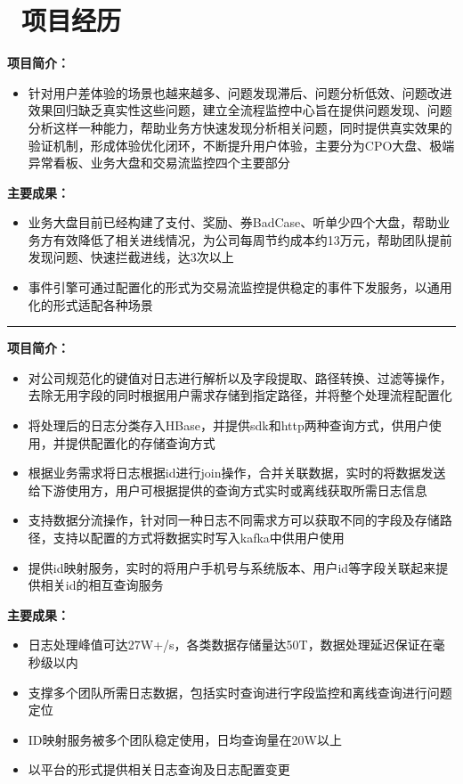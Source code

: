 \documentclass{resume}
\begin{document}
\section{\faUsers\ 项目经历}
\textbf{项目简介：}
\begin{itemize}
  \item 针对用户差体验的场景也越来越多、问题发现滞后、问题分析低效、问题改进效果回归缺乏真实性这些问题，建立全流程监控中心旨在提供问题发现、问题分析这样一种能力，帮助业务方快速发现分析相关问题，同时提供真实效果的验证机制，形成体验优化闭环，不断提升用户体验，主要分为CPO大盘、极端异常看板、业务大盘和交易流监控四个主要部分
\end{itemize}
\textbf{主要成果：}
\begin{itemize}
  \item 业务大盘目前已经构建了支付、奖励、券BadCase、听单少四个大盘，帮助业务方有效降低了相关进线情况，为公司每周节约成本约13万元，帮助团队提前发现问题、快速拦截进线，达3次以上
  \item 事件引擎可通过配置化的形式为交易流监控提供稳定的事件下发服务，以通用化的形式适配各种场景
\end{itemize}

\rule{\textwidth}{0.1mm}
\textbf{项目简介：}
\begin{itemize}
  \item 对公司规范化的键值对日志进行解析以及字段提取、路径转换、过滤等操作，去除无用字段的同时根据用户需求存储到指定路径，并将整个处理流程配置化
  \item 将处理后的日志分类存入HBase，并提供sdk和http两种查询方式，供用户使用，并提供配置化的存储查询方式
  \item 根据业务需求将日志根据id进行join操作，合并关联数据，实时的将数据发送给下游使用方，用户可根据提供的查询方式实时或离线获取所需日志信息
  \item 支持数据分流操作，针对同一种日志不同需求方可以获取不同的字段及存储路径，支持以配置的方式将数据实时写入kafka中供用户使用
  \item 提供id映射服务，实时的将用户手机号与系统版本、用户id等字段关联起来提供相关id的相互查询服务
\end{itemize}
\textbf{主要成果：}
\begin{itemize}
  \item 日志处理峰值可达27W+/s，各类数据存储量达50T，数据处理延迟保证在毫秒级以内
  \item 支撑多个团队所需日志数据，包括实时查询进行字段监控和离线查询进行问题定位
  \item ID映射服务被多个团队稳定使用，日均查询量在20W以上
  \item 以平台的形式提供相关日志查询及日志配置变更
\end{itemize}
\end{document}
